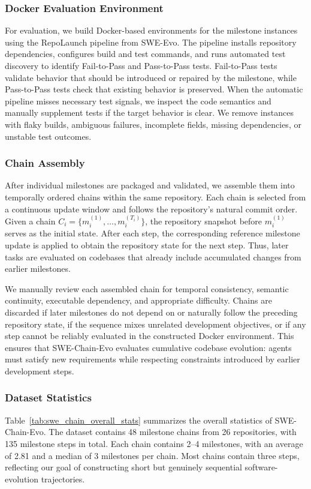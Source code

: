 \documentclass{article}
\begin{document}
\subsubsection{Docker Evaluation Environment}
\label{app:swe_docker_evaluation}
For evaluation, we build Docker-based environments for the milestone instances using the RepoLaunch pipeline from SWE-Evo. The pipeline installs repository dependencies, configures build and test commands, and runs automated test discovery to identify Fail-to-Pass and Pass-to-Pass tests. Fail-to-Pass tests validate behavior that should be introduced or repaired by the milestone, while Pass-to-Pass tests check that existing behavior is preserved. When the automatic pipeline misses necessary test signals, we inspect the code semantics and manually supplement tests if the target behavior is clear. We remove instances with flaky builds, ambiguous failures, incomplete fields, missing dependencies, or unstable test outcomes.

\subsubsection{Chain Assembly}
\label{app:swe_chain_assembly}
After individual milestones are packaged and validated, we assemble them into temporally ordered chains within the same repository. Each chain is selected from a continuous update window and follows the repository's natural commit order. Given a chain \(C_i = \{m_i^{(1)}, \ldots, m_i^{(T_i)}\}\), the repository snapshot before \(m_i^{(1)}\) serves as the initial state. After each step, the corresponding reference milestone update is applied to obtain the repository state for the next step. Thus, later tasks are evaluated on codebases that already include accumulated changes from earlier milestones.

We manually review each assembled chain for temporal consistency, semantic continuity, executable dependency, and appropriate difficulty. Chains are discarded if later milestones do not depend on or naturally follow the preceding repository state, if the sequence mixes unrelated development objectives, or if any step cannot be reliably evaluated in the constructed Docker environment. This ensures that SWE-Chain-Evo evaluates cumulative codebase evolution: agents must satisfy new requirements while respecting constraints introduced by earlier development steps.

\subsubsection{Dataset Statistics}
\label{app:swe_dataset_statistics}
Table~\ref{tab:swe_chain_overall_stats} summarizes the overall statistics of SWE-Chain-Evo. The dataset contains 48 milestone chains from 26 repositories, with 135 milestone steps in total. Each chain contains 2--4 milestones, with an average of 2.81 and a median of 3 milestones per chain. Most chains contain three steps, reflecting our goal of constructing short but genuinely sequential software-evolution trajectories.
\end{document}
